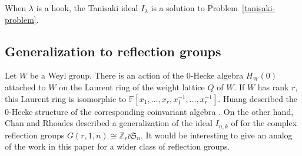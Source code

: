 \documentclass[ALCO,ThmDefs,published]{cedram}
\newcommand{\symm}{{\mathfrak{S}}}
\newcommand{\FF}{{\mathbb{F}}}
\theoremstyle{plain}
\newcommand{\symm}{{\mathfrak{S}}}
\newcommand{\ZZ}{{\mathbb {Z}}}
\newcommand{\FF}{{\mathbb{F}}}
\begin{document}
When $\lambda$ is a hook, the Tanisaki ideal $I_{\lambda}$ is a solution to Problem~\ref{tanisaki-problem}.

\subsection{Generalization to reflection groups}
Let $W$ be a Weyl group.  There is an action of the 0-Hecke algebra $H_W(0)$ attached to $W$
on the Laurent ring of the weight lattice $Q$ of $W$.  If $W$ has rank $r$, this Laurent ring is isomorphic
to $\FF[x_1, \dots, x_r, x_1^{-1}, \dots, x_r^{-1}]$.  Huang described the 0-Hecke structure of the corresponding
coinvariant algebra \cite[Thm. 5.3]{Huang}.
On the other hand, Chan and Rhoades \cite{CR} described a generalization of the ideal $I_{n,k}$
of \cite{HRS} for the complex reflection groups $G(r,1,n) \cong \ZZ_r \wr \symm_n$.
It would be interesting to give an analog of the work in this paper for a wider class of reflection groups.





%



\nocite{*}


\end{document}
